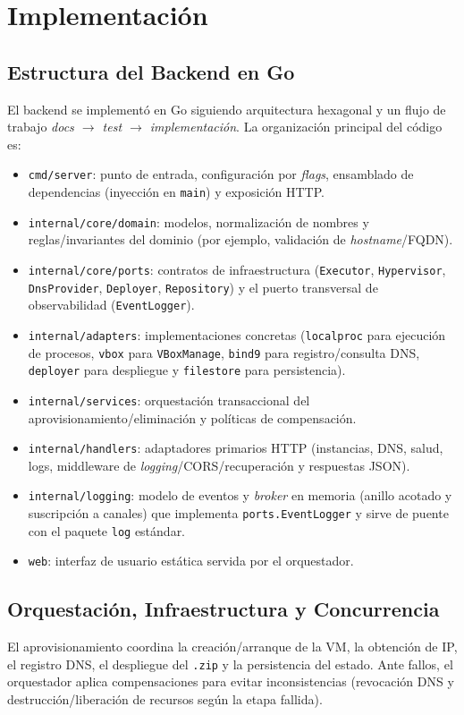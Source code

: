 \section{Implementación}

\subsection{Estructura del Backend en Go}
El backend se implementó en Go siguiendo arquitectura hexagonal y un flujo de trabajo \emph{docs $\rightarrow$ test $\rightarrow$ implementación}. La organización principal del código es:
\begin{itemize}
    \item \texttt{cmd/server}: punto de entrada, configuración por \textit{flags}, ensamblado de dependencias (inyección en \texttt{main}) y exposición HTTP.
    \item \texttt{internal/core/domain}: modelos, normalización de nombres y reglas/invariantes del dominio (por ejemplo, validación de \textit{hostname}/FQDN).
    \item \texttt{internal/core/ports}: contratos de infraestructura (\texttt{Executor}, \texttt{Hypervisor}, \texttt{DnsProvider}, \texttt{Deployer}, \texttt{Repository}) y el puerto transversal de observabilidad (\texttt{EventLogger}).
    \item \texttt{internal/adapters}: implementaciones concretas (\texttt{localproc} para ejecución de procesos, \texttt{vbox} para \texttt{VBoxManage}, \texttt{bind9} para registro/consulta DNS, \texttt{deployer} para despliegue y \texttt{filestore} para persistencia).
    \item \texttt{internal/services}: orquestación transaccional del aprovisionamiento/eliminación y políticas de compensación.
    \item \texttt{internal/handlers}: adaptadores primarios HTTP (instancias, DNS, salud, logs, middleware de \textit{logging}/CORS/recuperación y respuestas JSON).
    \item \texttt{internal/logging}: modelo de eventos y \textit{broker} en memoria (anillo acotado y suscripción a canales) que implementa \texttt{ports.EventLogger} y sirve de puente con el paquete \texttt{log} estándar.
    \item \texttt{web}: interfaz de usuario estática servida por el orquestador.
\end{itemize}

\subsection{Orquestación, Infraestructura y Concurrencia}
El aprovisionamiento coordina la creación/arranque de la VM, la obtención de IP, el registro DNS, el despliegue del \texttt{.zip} y la persistencia del estado. Ante fallos, el orquestador aplica compensaciones para evitar inconsistencias (revocación DNS y destrucción/liberación de recursos según la etapa fallida).

